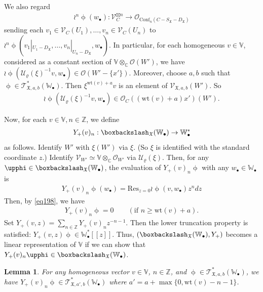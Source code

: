 \documentclass[12pt,b5paper,notitlepage]{report}
\theoremstyle{definition}
\theoremstyle{plain}
\newtheorem{lm}[df]{Lemma}
\newcommand{\fk}{\mathfrak}
\newcommand{\mc}{\mathcal}
\newcommand{\Conf}{\mathrm{Conf}}
\newcommand{\Res}{\mathrm{Res}}
\newcommand{\scr}{\mathscr}
\newcommand{\SX}{S_{\fk X}}
\newcommand{\DX}{D_{\fk X}}
\newcommand{\blt}{\bullet}
\newcommand{\Vbb}{\mathbb V}
\newcommand{\Wbb}{\mathbb W}
\newcommand{\Cbb}{\mathbb C}
\newcommand{\Zbb}{\mathbb Z}
\newcommand{\wt}{\mathrm{wt}}
\numberwithin{equation}{section}
\begin{document}
We also regard
\begin{gather*}
\wr^n\upphi(w_\blt):\scr V_C^{\boxtimes n}\rightarrow\scr O_{\Conf_n(C-\SX-\DX)}
\end{gather*}
sending each $v_1\in \scr V_C(U_1),\dots,v_n\in\scr V_C(U_n)$ to $\wr^n\upphi(v_1|_{U_1-\DX},\dots,v_n|_{U_n-\DX},w_\blt)$. In particular, for each homogeneous $v\in\Vbb$, considered as a constant section of $\Vbb\otimes_\Cbb\scr O(W')$, we have $\wr\upphi(\mc U_\varrho(\xi)^{-1} v,w_\blt)\in\scr O(W'-\{x'\})$. Moreover, choose $a,b$ such that $\upphi\in\scr T_{\fk X,a,b}^*(\Wbb_\blt)$. Then $\xi^{\wt(v)+a}v$ is an element of $\scr V_{\fk X,a,b}(W')$. So 
\begin{gather}
\wr\upphi(\mc U_\varrho(\xi)^{-1} v,w_\blt)\in \scr O_C((\wt(v)+a)x')(W').\label{eq198}
\end{gather}

Now, for each $v\in\Vbb,n\in\Zbb$, we define
\begin{gather*}
Y_+(v)_n:\boxbackslash_{\fk X}(\Wbb_\blt)\rightarrow\Wbb_\blt^*
\end{gather*}
as follows. Identify $W'$ with $\xi(W')$ via $\xi$. (So $\xi$ is identified with the standard coordinate $z$.) Identify  $\scr V_{W'}\simeq\Vbb\otimes_\Cbb\scr O_{W'}$ via $\mc U_\varrho(\xi)$.  Then, for any $\upphi\in\boxbackslash_{\fk X}(\Wbb_\blt)$, the evaluation of $Y_+(v)_n\upphi$ with any $w_\blt\in\Wbb_\blt$ is
\begin{gather}
\boxed{~~Y_+(v)_n\upphi(w_\blt)=\Res_{z=0}\wr\upphi( v,w_\blt)z^ndz~~}\label{eq199}
\end{gather}
Then, by \eqref{eq198}, we have
\begin{align}
Y_+(v)_n\upphi=0\qquad (\text{if }n\geq \wt(v)+a).\label{eq200}
\end{align}
Set $Y_+(v,z)=\sum_{n\in\Zbb}Y_+(v)_nz^{-n-1}$.  Then the lower truncation property is satisfied: $Y_+(v,z)\upphi\in \Wbb_\blt^*[[z]]$.  Thus, $(\boxbackslash_{\fk X}(\Wbb_\blt),Y_+)$ becomes a linear representation of $\Vbb$ if we can show that $Y_+(v)_n\upphi\in \boxbackslash_{\fk X}(\Wbb_\blt)$.

\begin{lm}\label{lb93}
For any homogeneous vector $v\in\Vbb$, $n\in\Zbb$, and $\upphi\in\scr T_{\fk X,a,b}^*(\Wbb_\blt)$, we have $Y_+(v)_n\upphi\in \scr T_{\fk X,a',b}^*(\Wbb_\blt)$ where $a'=a+\max\{0,\wt(v)-n-1\}$.
\end{lm}
\end{document}
